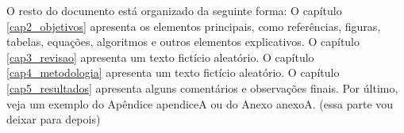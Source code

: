O resto do documento está organizado da seguinte forma: O capítulo \ref{cap2_objetivos} apresenta os elementos principais, como referências, figuras, tabelas, equações, algoritmos e outros elementos explicativos. O capítulo \ref{cap3_revisao} apresenta um texto fictício aleatório. O capítulo \ref{cap4_metodologia} apresenta um texto fictício aleatório. O capítulo \ref{cap5_resultados} apresenta alguns comentários e observações finais. Por último, veja um exemplo do Apêndice apendiceA ou do Anexo anexoA. (essa parte vou deixar para depois)


